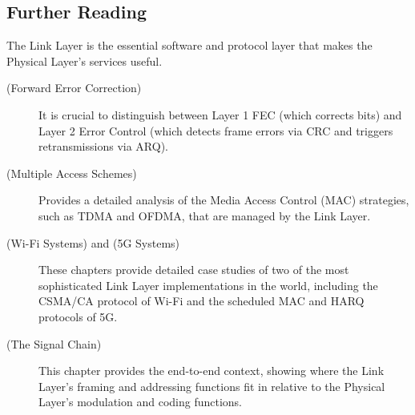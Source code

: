 \begin{importantbox}
\section*{Further Reading}
The Link Layer is the essential software and protocol layer that makes the Physical Layer's services useful.
\begin{description}
    \item[ (Forward Error Correction)] It is crucial to distinguish between Layer 1 FEC (which corrects bits) and Layer 2 Error Control (which detects frame errors via CRC and triggers retransmissions via ARQ).
    \item[ (Multiple Access Schemes)] Provides a detailed analysis of the Media Access Control (MAC) strategies, such as TDMA and OFDMA, that are managed by the Link Layer.
    \item[ (Wi-Fi Systems) and  (5G Systems)] These chapters provide detailed case studies of two of the most sophisticated Link Layer implementations in the world, including the CSMA/CA protocol of Wi-Fi and the scheduled MAC and HARQ protocols of 5G.
    \item[ (The Signal Chain)] This chapter provides the end-to-end context, showing where the Link Layer's framing and addressing functions fit in relative to the Physical Layer's modulation and coding functions.
\end{description}
\end{importantbox}
